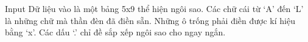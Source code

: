 Input
Dữ liệu vào là một bảng 5x9 thể hiện ngôi sao. Các chữ cái từ ‘A’ đến ‘L’ là những chữ mà thần đèn đã điền sẵn. Những ô trống phải điền được kí hiệu bằng ‘x’. Các dấu ‘.’ chỉ đề sắp xếp ngôi sao cho ngay ngắn.